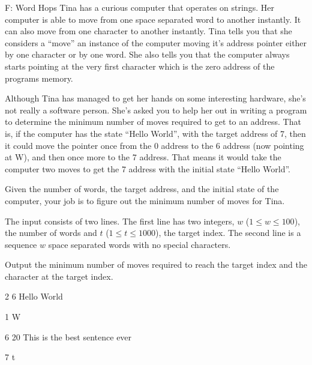 \begin{problem}{F: Word Hops}
Tina has a curious computer that operates on strings.
Her computer is able to move from one space separated word to another instantly.
It can also move from one character to another instantly.
Tina tells you that she considers a ``move'' an instance of the computer moving it's address pointer either by one character or by one word.
She also tells you that the computer always starts pointing at the very first character which is the zero address of the programs memory.

Although Tina has managed to get her hands on some interesting hardware, she's not really a software person.
She's asked you to help her out in writing a program to determine the minimum number of moves required to get to an address.
That is, if the computer has the state ``Hello World'', with the target address of 7, then it could move the pointer once from the 0 address to the 6 address (now pointing at W), and then once more to the 7 address.
That means it would take the computer two moves to get the 7 address with the initial state ``Hello World''.

Given the number of words, the target address, and the initial state of the computer, your job is to figure out the minimum number of moves for Tina.
\end{problem}

\begin{formalin}
The input consists of two lines.
The first line has two integers, $w$ ($1 \leq w \leq 100$), the number of words and $t$ ($1 \leq t \leq 1000$), the target index.
The second line is a sequence $w$ space separated words with no special characters.
\end{formalin}

\begin{formalout}
Output the minimum number of moves required to reach the target index and the character at the target index.
\end{formalout}

\begin{datain}
2 6
Hello World
\end{datain}
\begin{dataout}
1 W
\end{dataout}

\begin{datain}
6 20
This is the best sentence ever
\end{datain}
\begin{dataout}
7 t
\end{dataout}
